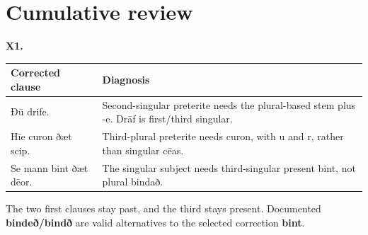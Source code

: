 \clearpage
\section*{Cumulative review}

\par\begin{minipage}{\linewidth}\raggedright
\textbf{X1.}

\par\begingroup
\fontsize{10.5}{13.2}\selectfont
\setlength{\LTleft}{0pt}\setlength{\LTright}{\fill}
\noindent
\begin{tabular}{@{}>{\raggedright\arraybackslash}p{27.9mm}>{\raggedright\arraybackslash}p{93.29mm}@{}}
\toprule
\textbf{Corrected clause} & \textbf{Diagnosis} \\
\midrule
Ðū drife. & Second-singular preterite needs the plural-based stem plus -e. Drāf is first/\allowbreak{}third singular. \\
Hīe curon ðæt scip. & Third-plural preterite needs curon, with u and r, rather than singular cēas. \\
Se mann bint ðæt dēor. & The singular subject needs third-singular present bint, not plural bindað. \\
\bottomrule
\end{tabular}
\par\endgroup

The two first clauses stay past, and the third stays present. Documented \textbf{bindeð/\allowbreak{}bindð} are valid alternatives to the selected correction \textbf{bint}.

\end{minipage}\par\addvspace{4pt}

